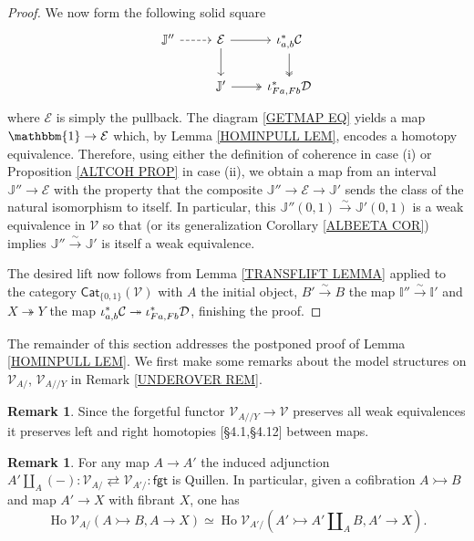 \documentclass[a4paper,10pt
,draft
]{article}%
\numberwithin{equation}{section}
\numberwithin{figure}{section}
\theoremstyle{definition} %
\newtheorem{remark}[equation]{Remark}%
\DeclareMathOperator{\Ho}{Ho}
\newcommand{\V}{\ensuremath{\mathcal V}}
\newcommand{\1}{\ensuremath{\mathbbm 1}}%
\begin{document}
\begin{proof}
	We now form the following solid square
	\begin{equation}
	\begin{tikzcd}
	\mathbb{J}'' \ar[dashed]{r}
	&
	\mathcal{E} \ar{d} \ar{r}
	&
	\iota^{\**}_{a,b} \mathcal{C} \ar[twoheadrightarrow]{d}
	\\
	&
	\mathbb{J}' \ar[twoheadrightarrow]{r} 
	&
	\iota^{\**}_{Fa,Fb} \mathcal{D}
	\end{tikzcd}
	\end{equation}
	where $\mathcal{E}$ is simply the pullback.
	The diagram 
	\eqref{GETMAP EQ}
	yields a map $\mathbbm{1} \to \mathcal{E}$ which,
	by Lemma \ref{HOMINPULL LEM},
	encodes a homotopy equivalence.
	Therefore, using either the definition of coherence in case (i) or Proposition \ref{ALTCOH PROP} in case (ii),
	we obtain a map from an interval 
	$\mathbb{J}'' \to \mathcal{E}$
	with the property that 
	the composite 
	$\mathbb{J}'' \to \mathcal{E} \to \mathbb{J}'$
	sends the class of the natural isomorphism to itself.
	In particular, this 
	$\mathbb{J}''(0,1) \xrightarrow{\sim} \mathbb{J}'(0,1)$ 
	is a weak equivalence in $\V$
	so that \cite[Lemma 2.12]{BM13}
	(or its generalization Corollary \ref{ALBEETA COR})
	implies
	$\mathbb{J}'' \xrightarrow{\sim} \mathbb{J}'$ 
	is itself a weak equivalence.
	
	The desired lift now follows from 
	Lemma \ref{TRANSFLIFT LEMMA}
	applied to the category
	$\mathsf{Cat}_{\{0,1\}}(\V)$
	with $A$ the initial object,
	$B' \xrightarrow{\sim} B$ the map
	$\mathbb{I}'' \xrightarrow{\sim} \mathbb{I}'$
	and $X \twoheadrightarrow Y$
	the map 
	$\iota^{\**}_{a,b} \mathcal{C}
	\twoheadrightarrow
	\iota^{\**}_{Fa,Fb} \mathcal{D}$,
	finishing the proof.
\end{proof}



The remainder of this section addresses the postponed proof of
Lemma \ref{HOMINPULL LEM}.
We first make some remarks about 
the model structures
on $\V_{A/}$, $\V_{A//Y}$ in Remark \ref{UNDEROVER REM}.



\begin{remark}\label{UNDFGT REM}
Since the forgetful functor $\V_{A//Y} \to \V$
preserves all weak equivalences 
it preserves left and right homotopies \cite{DS95}[\S 4.1,\S 4.12] between maps.
\end{remark}


\begin{remark} \label{LEFTQUILUND REM}
For any map $A \to A'$ the induced adjunction
$A' \amalg_A (-) \colon \V_{A/} 
\rightleftarrows 
\V_{A'/} \colon \mathsf{fgt}$
is Quillen.
In particular,
given a cofibration 
$A \rightarrowtail B$
and map $A' \to X$ with fibrant $X$, one has
\[
\Ho \V_{A/}\left(A \rightarrowtail B, A \to X\right)
\simeq
\Ho \V_{A'/}\left(A' \rightarrowtail A' \amalg_A B, A' \to X\right).
\]
\end{remark}
\end{document}

